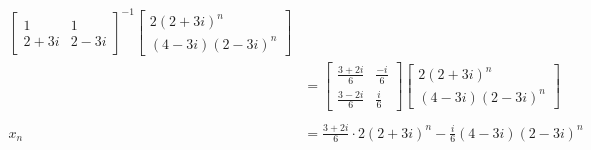 \documentclass[12pt]{exam}
\begin{document}
\begin{questions}
\begin{parts}
\begin{solution}
\begin{align*}
\begin{bmatrix}
                    1 & 1 \\ 2 + 3i & 2 - 3i
                \end{bmatrix}^{-1} \begin{bmatrix}
                    2(2 + 3i)^n \\ (4 - 3i) (2 - 3i)^n
                \end{bmatrix} \\
                &= \begin{bmatrix}
                    \frac{3 + 2i}{6} & \frac{-i}{6} \\ \frac{3 - 2i}{6} & \frac i6
                \end{bmatrix} \begin{bmatrix}
                    2(2 + 3i)^n \\ (4 - 3i) (2 - 3i)^n
                \end{bmatrix} \\\\
                x_n &= \frac{3 + 2i }{6} \cdot 2(2 + 3i )^n -\frac{i}{6} (4 - 3i) (2 - 3i)^n
            \end{align*}
        \end{solution}
\end{parts}


\clearpage
\question \begin{parts}

\end{parts}
\end{questions}
\end{document}
